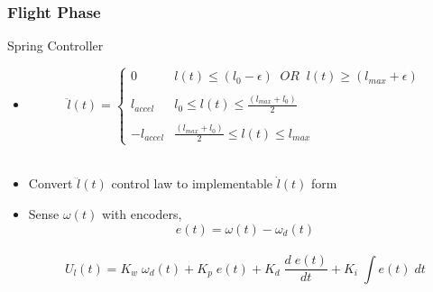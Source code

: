 \begin{frame}
\frametitle{Flight Phase}
\begin{block}{Spring Controller}
\begin{itemize}
  \item
  \begin{equation*}
  \ddot{l}(t) = \left\{\begin{array}{ll}
			0 & l(t) \leq (l_0 - \epsilon)\;\;OR\;\;l(t) \geq (l_{max} + \epsilon)\\
			&\\
			l_{accel} & l_0 \leq l(t) \leq \frac{(l_{max} + l_0)}{2}\\
			&\\
			-l_{accel} & \frac{(l_{max} + l_0)}{2} \leq l(t) \leq l_{max}
                      \end{array} \right.
  \label{eqn:4_spring_retract}
  \end{equation*}\\[0.1in]
    \item
    Convert $\ddot{l}(t)$ control law to implementable $\dot{l}(t)$ form\\[0.1in]
   \item 
    Sense $\omega(t)$ with encoders,
    \begin{equation*}
    e(t) = \omega(t) - \omega_d(t)
    \end{equation*}\\[0.1in]
    \begin{equation*}
    U_{l}(t) = K_w\;\omega_d(t) + K_p\;e(t) + K_d\;\frac{d\;e(t)}{dt} + K_i\;\int e(t)\;dt
    \label{eqn:4_l_controller}
    \end{equation*}

\end{itemize}
\end{block}
\end{frame}


